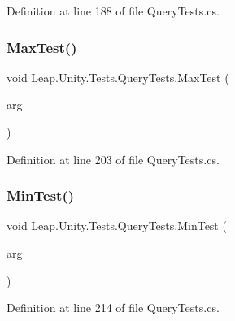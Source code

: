 Definition at line 188 of file Query\+Tests.\+cs.

\mbox{\label{class_leap_1_1_unity_1_1_tests_1_1_query_tests_aef878cd4eb6220f4a0596cf796ffcd78}} 
\subsubsection{\texorpdfstring{MaxTest()}{MaxTest()}}
{\footnotesize\ttfamily void Leap.\+Unity.\+Tests.\+Query\+Tests.\+Max\+Test (\begin{DoxyParamCaption}\item[{\mbox{[}\+Value\+Source(\char`\"{}list0\char`\"{})\mbox{]} \mbox{\hyperlink{class_leap_1_1_unity_1_1_tests_1_1_query_tests_1_1_query_arg}{Query\+Arg}}}]{arg }\end{DoxyParamCaption})}



Definition at line 203 of file Query\+Tests.\+cs.

\mbox{\label{class_leap_1_1_unity_1_1_tests_1_1_query_tests_a669814dda36f3656ccb56a00c19f632c}} 
\subsubsection{\texorpdfstring{MinTest()}{MinTest()}}
{\footnotesize\ttfamily void Leap.\+Unity.\+Tests.\+Query\+Tests.\+Min\+Test (\begin{DoxyParamCaption}\item[{\mbox{[}\+Value\+Source(\char`\"{}list0\char`\"{})\mbox{]} \mbox{\hyperlink{class_leap_1_1_unity_1_1_tests_1_1_query_tests_1_1_query_arg}{Query\+Arg}}}]{arg }\end{DoxyParamCaption})}



Definition at line 214 of file Query\+Tests.\+cs.

\mbox{\label{class_leap_1_1_unity_1_1_tests_1_1_query_tests_a1e678d24f8674a66cbf7d3f94e112d58}} 
